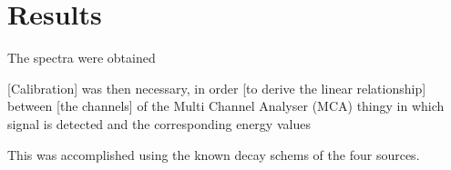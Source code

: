 \section{Results}
The spectra were obtained

[Calibration] was then necessary,
in order [to derive the linear relationship] between [the channels] of the Multi Channel Analyser (MCA) thingy in which signal is detected 
and the corresponding energy values

This was accomplished using the known decay schems of the four sources.